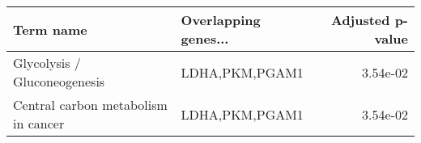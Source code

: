 \begin{tabular}{llr}
\toprule
                          Term name & Overlapping genes... &  Adjusted p-value \\
\midrule
       Glycolysis / Gluconeogenesis &       LDHA,PKM,PGAM1 &          3.54e-02 \\
Central carbon metabolism in cancer &       LDHA,PKM,PGAM1 &          3.54e-02 \\
\bottomrule
\end{tabular}
